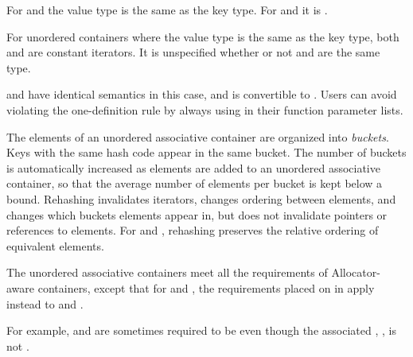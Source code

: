 \pnum
For  and  the value type is
the same as the key type.  For  and
 it is .

\pnum
For unordered containers where the value type is the same as the key
type, both  and  are constant
iterators. It is unspecified whether or not  and
 are the same type.
\begin{note}
 and  have identical
semantics in this case, and  is convertible to
. Users can avoid violating the one-definition rule
by always using  in their function parameter lists.
\end{note}

\pnum
{}%
%
The elements of an unordered associative container are organized into
\textit{buckets}.  Keys with the same hash code appear in the same
bucket.  The number of buckets is automatically increased as elements
are added to an unordered associative container, so that the average
number of elements per bucket is kept below a bound.  Rehashing
invalidates iterators, changes ordering between elements, and changes
which buckets elements appear in, but does not invalidate pointers or
references to elements. For  and
, rehashing preserves the relative ordering of
equivalent elements.

\pnum
The unordered associative containers meet all the requirements of Allocator-aware
containers, except that for
 and , the requirements placed on 
in  apply instead to 
and .
\begin{note}
For example,  and 
are sometimes required to be  even though the associated
, , is not
.
\end{note}

